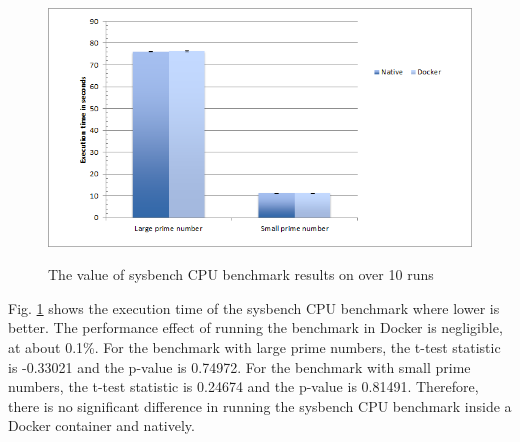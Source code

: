 \documentclass[11pt]{article}
\begin{document}
\begin{figure}
	\centering
	{\includegraphics[width=150mm]{cpu.png}}
	\caption{ The value of sysbench CPU benchmark results on over 10 runs}
	\label{fig:cpu}
\end{figure}

Fig. \ref{fig:cpu} shows the execution time of the sysbench CPU benchmark where lower is better. The performance effect of running the benchmark in Docker is negligible, at about 0.1\%. For the benchmark with large prime numbers, the t-test statistic is -0.33021 and the p-value is 0.74972. For the benchmark with small prime numbers, the t-test statistic is 0.24674 and the p-value is 0.81491. Therefore, there is no significant difference in running the sysbench CPU benchmark inside a Docker container and natively.  
\end{document}
